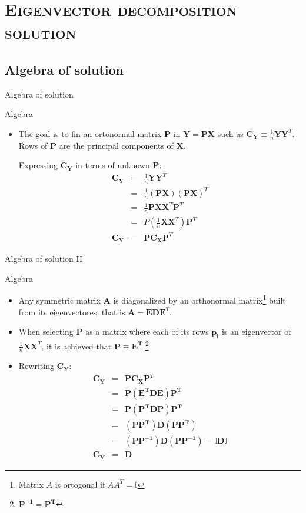 \documentclass[xcolor=x11names,compress,10pt]{beamer}
\renewcommand{\(}{\begin{columns}}
\renewcommand{\)}{\end{columns}}
\newcommand{\<}[1]{\begin{column}{#1}}
\renewcommand{\>}{\end{column}}
\begin{document}
\section{\scshape Eigenvector decomposition solution}
\subsection{Algebra of solution}
\begin{frame}{Algebra of solution}
\begin{block}{Algebra}
\begin{itemize}
	\item The goal is to fin an ortonormal matrix $\mathbf{P}$ in $\mathbf{Y} = \mathbf{PX}$ such as $\mathbf{C_Y} \equiv \frac{1}{n}\mathbf{YY}^T$.
Rows of $\mathbf{P}$ are the principal components of $\mathbf{X}$.

Expressing $\mathbf{C_Y}$ in terms of unknown $\mathbf{P}$:
\begin{eqnarray}
\mathbf{C_Y} 	&=& \frac{1}{n} \mathbf{YY}^T \\
				&=& \frac{1}{n} (\mathbf{PX})(\mathbf{PX})^T \\
				&=& \frac{1}{n} \mathbf{PXX}^T\mathbf{P}^T \\
				&=& P(\frac{1}{n} \mathbf{XX}^T)\mathbf{P}^T \\
\mathbf{C_Y}	&=& \mathbf{PC_XP}^T
\end{eqnarray}
\end{itemize}

\end{block}
\end{frame}

\begin{frame}{Algebra of solution II}
\begin{block}{Algebra}
\begin{itemize}
	\item Any symmetric matrix $\mathbf{A}$ is diagonalized by an orthonormal matrix\footnote{Matrix $A$ is ortogonal if $AA^T = \mathbb{I}$} built from its eigenvectores, that is $\mathbf{A}=\mathbf{EDE}^T$.
	\item When selecting $\mathbf{P}$ as a matrix where each of its rows $\mathbf{p_i}$ is an eigenvector of $\frac{1}{n}\mathbf{XX}^T$, it is achieved that $\mathbf{P} \equiv \mathbf{E^T}$.\footnote{$\mathbf{P^{-1} = P^T}$}
	\item Rewriting $\mathbf{C_Y}$:
\begin{eqnarray}
\mathbf{C_Y}	&=& \mathbf{PC_XP}^T \\
				&=& \mathbf{P(E^TDE)P^T} \\
				&=& \mathbf{P(P^TDP)P^T} \\
				&=& \mathbf{(PP^T)D(PP^T)} \\
				&=& \mathbf{(PP^{-1})D(PP^{-1})} = \mathbf{\mathbb{I}D\mathbb{I}}\\
\mathbf{C_Y}	&=& \mathbf{D}
\end{eqnarray}
\end{itemize}
\end{block}
\end{frame}
\end{document}
